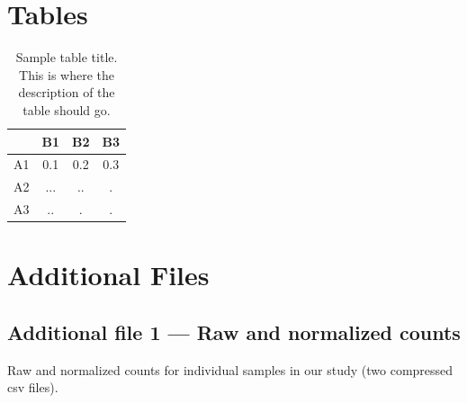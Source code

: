 \documentclass{bmcart}
\begin{document}
\begin{backmatter}



\section*{Tables}
\begin{table}[h!]
\caption{Sample table title. This is where the description of the table should go.}
      \begin{tabular}{cccc}
        \hline
           & B1  &B2   & B3\\ \hline
        A1 & 0.1 & 0.2 & 0.3\\
        A2 & ... & ..  & .\\
        A3 & ..  & .   & .\\ \hline
      \end{tabular}
\end{table}


\section*{Additional Files}
  \subsection*{Additional file 1 --- Raw and normalized counts }
  Raw and normalized counts for individual samples in our
  study (two compressed csv files).
  

\end{backmatter}
\end{document}
